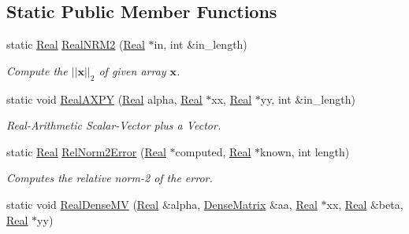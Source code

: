 \subsection*{Static Public Member Functions}
\begin{DoxyCompactItemize}
\item 
static \hyperlink{group__c01-roots_gac080bbbf5cbb5502c9f00405f894857d}{Real} \hyperlink{classmtk_1_1BLASAdapter_ab92440888b730863244c5d9479c11aca}{Real\-N\-R\-M2} (\hyperlink{group__c01-roots_gac080bbbf5cbb5502c9f00405f894857d}{Real} $\ast$in, int \&in\-\_\-length)
\begin{DoxyCompactList}\small\item\em Compute the $ ||\mathbf{x}||_2 $ of given array $ \mathbf{x} $. \end{DoxyCompactList}\item 
static void \hyperlink{classmtk_1_1BLASAdapter_a081cd092ae65e730f44eae8643edd539}{Real\-A\-X\-P\-Y} (\hyperlink{group__c01-roots_gac080bbbf5cbb5502c9f00405f894857d}{Real} alpha, \hyperlink{group__c01-roots_gac080bbbf5cbb5502c9f00405f894857d}{Real} $\ast$xx, \hyperlink{group__c01-roots_gac080bbbf5cbb5502c9f00405f894857d}{Real} $\ast$yy, int \&in\-\_\-length)
\begin{DoxyCompactList}\small\item\em Real-\/\-Arithmetic Scalar-\/\-Vector plus a Vector. \end{DoxyCompactList}\item 
static \hyperlink{group__c01-roots_gac080bbbf5cbb5502c9f00405f894857d}{Real} \hyperlink{classmtk_1_1BLASAdapter_af2ac5691f45e67d6e26186b071119ec4}{Rel\-Norm2\-Error} (\hyperlink{group__c01-roots_gac080bbbf5cbb5502c9f00405f894857d}{Real} $\ast$computed, \hyperlink{group__c01-roots_gac080bbbf5cbb5502c9f00405f894857d}{Real} $\ast$known, int length)
\begin{DoxyCompactList}\small\item\em Computes the relative norm-\/2 of the error. \end{DoxyCompactList}\item 
static void \hyperlink{classmtk_1_1BLASAdapter_afdcac059a4294287cb55638221220646}{Real\-Dense\-M\-V} (\hyperlink{group__c01-roots_gac080bbbf5cbb5502c9f00405f894857d}{Real} \&alpha, \hyperlink{classmtk_1_1DenseMatrix}{Dense\-Matrix} \&aa, \hyperlink{group__c01-roots_gac080bbbf5cbb5502c9f00405f894857d}{Real} $\ast$xx, \hyperlink{group__c01-roots_gac080bbbf5cbb5502c9f00405f894857d}{Real} \&beta, \hyperlink{group__c01-roots_gac080bbbf5cbb5502c9f00405f894857d}{Real} $\ast$yy)

\end{DoxyCompactItemize}
